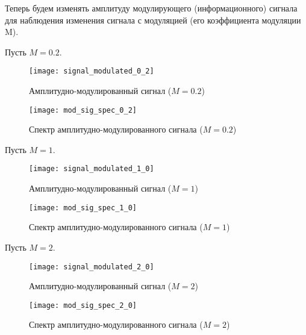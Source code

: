 Теперь будем изменять амплитуду модулирующего (информационного) сигнала для наблюдения изменения сигнала с модуляцией (его коэффициента модуляции M).

Пусть $M = 0.2$.
\begin{figure}[H]
	\begin{center}
		\texttt{[image: signal\_modulated\_0\_2]}
		\caption{Амплитудно-модулированный сигнал ($M = 0.2$)} 
		\label{pic:signal_modulated_0_2} %
	\end{center}
\end{figure}
\begin{figure}[H]
	\begin{center}
		\texttt{[image: mod\_sig\_spec\_0\_2]}
		\caption{Спектр амплитудно-модулированного сигнала ($M = 0.2$)} 
		\label{pic:mod_sig_spec_0_2} %
	\end{center}
\end{figure}

Пусть $M = 1$.
\begin{figure}[H]
	\begin{center}
		\texttt{[image: signal\_modulated\_1\_0]}
		\caption{Амплитудно-модулированный сигнал ($M = 1$)} 
		\label{pic:signal_modulated_1_0} %
	\end{center}
\end{figure}
\begin{figure}[H]
	\begin{center}
		\texttt{[image: mod\_sig\_spec\_1\_0]}
		\caption{Спектр амплитудно-модулированного сигнала ($M = 1$)} 
		\label{pic:mod_sig_spec_1_0} %
	\end{center}
\end{figure}

Пусть $M = 2$.
\begin{figure}[H]
	\begin{center}
		\texttt{[image: signal\_modulated\_2\_0]}
		\caption{Амплитудно-модулированный сигнал ($M = 2$)} 
		\label{pic:signal_modulated_2_0} %
	\end{center}
\end{figure}
\begin{figure}[H]
	\begin{center}
		\texttt{[image: mod\_sig\_spec\_2\_0]}
		\caption{Спектр амплитудно-модулированного сигнала ($M = 2$)} 
		\label{pic:mod_sig_spec_2_0} %
	\end{center}
\end{figure}

